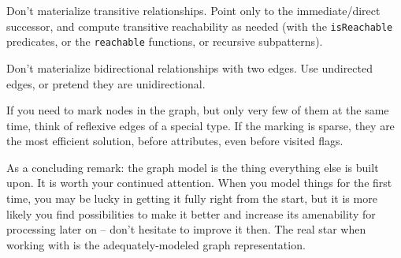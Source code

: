 \pagebreak

\begin{note}
Don't materialize transitive relationships. 
Point only to the immediate/direct successor, and compute transitive reachability as needed (with the \texttt{isReachable} predicates, or the \texttt{reachable} functions, or recursive subpatterns).
\end{note}

\begin{note}
Don't materialize bidirectional relationships with two edges. 
Use undirected edges, or pretend they are unidirectional.
\end{note}

\begin{note}
If you need to mark nodes in the graph, but only very few of them at the same time, think of reflexive edges of a special type. If the marking is sparse, they are the most efficient solution, before attributes, even before visited flags.
\end{note}

As a concluding remark: the graph model is the thing everything else is built upon.
It is worth your continued attention.
When you model things for the first time, you may be lucky in getting it fully right from the start, but it is more likely you find possibilities to make it better and increase its amenability for processing later on -- don't hesitate to improve it then.
The real star when working with \GrG{} is the adequately-modeled graph representation.

